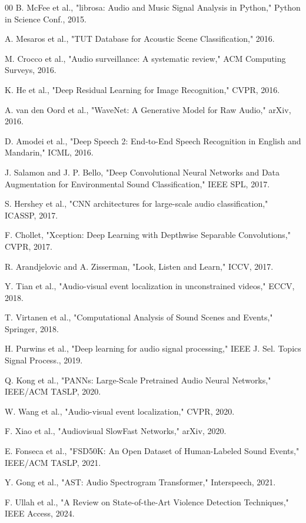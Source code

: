 \documentclass[conference]{IEEEtran}
\begin{document}
\begin{thebibliography}{00}
 B. McFee et al., "librosa: Audio and Music Signal Analysis in Python," Python in Science Conf., 2015.

 A. Mesaros et al., "TUT Database for Acoustic Scene Classification," 2016.

 M. Crocco et al., "Audio surveillance: A systematic review," ACM Computing Surveys, 2016.

 K. He et al., "Deep Residual Learning for Image Recognition," CVPR, 2016.

 A. van den Oord et al., "WaveNet: A Generative Model for Raw Audio," arXiv, 2016.

 D. Amodei et al., "Deep Speech 2: End-to-End Speech Recognition in English and Mandarin," ICML, 2016.

 J. Salamon and J. P. Bello, "Deep Convolutional Neural Networks and Data Augmentation for Environmental Sound Classification," IEEE SPL, 2017.

 S. Hershey et al., "CNN architectures for large-scale audio classification," ICASSP, 2017.

 F. Chollet, "Xception: Deep Learning with Depthwise Separable Convolutions," CVPR, 2017.

 R. Arandjelovic and A. Zisserman, "Look, Listen and Learn," ICCV, 2017.

 Y. Tian et al., "Audio-visual event localization in unconstrained videos," ECCV, 2018.

 T. Virtanen et al., "Computational Analysis of Sound Scenes and Events," Springer, 2018.

 H. Purwins et al., "Deep learning for audio signal processing," IEEE J. Sel. Topics Signal Process., 2019.

 Q. Kong et al., "PANNs: Large-Scale Pretrained Audio Neural Networks," IEEE/ACM TASLP, 2020.

 W. Wang et al., "Audio-visual event localization," CVPR, 2020.

 F. Xiao et al., "Audiovisual SlowFast Networks," arXiv, 2020.

 E. Fonseca et al., "FSD50K: An Open Dataset of Human-Labeled Sound Events," IEEE/ACM TASLP, 2021.

 Y. Gong et al., "AST: Audio Spectrogram Transformer," Interspeech, 2021.

 F. Ullah et al., "A Review on State-of-the-Art Violence Detection Techniques," IEEE Access, 2024.


\end{thebibliography}
\end{document}
